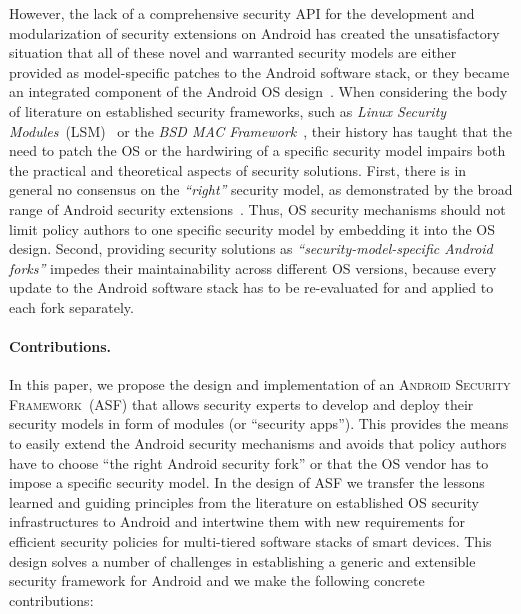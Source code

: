 \documentclass[letterpaper,twocolumn,10pt]{article}
\newcommand{\OURNAME}{\textsc{Android Security Framework}\xspace}
\newcommand{\OURSHORT}{\textsc{ASF}\xspace}
\begin{document}
However, the lack of a comprehensive security API for the development and modularization of security extensions on Android has created the unsatisfactory situation that all of these novel and warranted security models are either provided as model-specific patches to the Android software stack, or they became an integrated component of the Android OS design~\cite{Smalley2013}. When considering the body of literature on established security frameworks, such as \textit{Linux Security Modules}~(LSM)~\cite{Wright:2002:LSM:647253.720287} or the \textit{BSD MAC Framework}~\cite{conf/usenix/WatsonMVF03}, their history has taught that the need to patch the OS or the hardwiring of a specific security model impairs both the practical and theoretical aspects of security solutions. First, there is in general no consensus on the \textit{``right''} security model, as demonstrated by the broad range of Android security extensions~\cite{CoNgCr_10:CRePE,OnMcEnMc_09:Saint,backes13TACAS,tissa11,trustdroid,BuDaDm_12:TowardsT,Smalley2013}. Thus, OS security mechanisms should not limit policy authors to one specific security model by embedding it into the OS design. Second, providing security solutions as \textit{``security-model-specific Android forks''} impedes their maintainability across different OS versions, because every update to the Android software stack has to be re-evaluated for and applied to each fork separately.

\paragraph{Contributions.}

In this paper, we propose the design and implementation of an \OURNAME~(\OURSHORT) that allows security experts to develop and deploy their security models in form of modules (or ``security apps''). This provides the means to easily extend the Android security mechanisms and avoids that policy authors have to choose ``the right Android security fork'' or that the OS vendor has to impose a specific security model. In the design of \OURSHORT we transfer the lessons learned and guiding principles from the literature on established OS security infrastructures to Android and intertwine them with new requirements for efficient security policies for multi-tiered software stacks of smart devices. This design solves a number of challenges in establishing a generic and extensible security framework for Android and we make the following concrete contributions:
\end{document}
